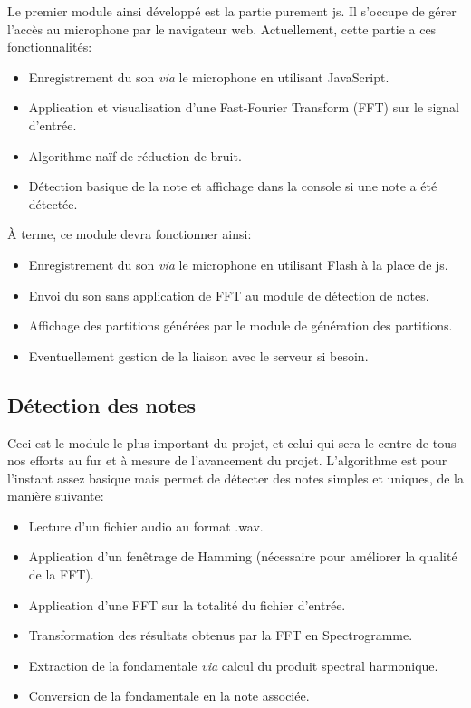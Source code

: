 \documentclass[12pt]{article}
\begin{document}
\par Le premier module ainsi développé est la partie purement js. Il s'occupe de gérer l'accès au microphone par le navigateur web. Actuellement, cette partie a ces fonctionnalités:
\begin{itemize}

\item Enregistrement du son \emph{via} le microphone en utilisant JavaScript.
\item Application et visualisation d'une Fast-Fourier Transform (FFT) sur le signal d'entrée.
\item Algorithme naïf de réduction de bruit.
\item Détection basique de la note et affichage dans la console si une note a été détectée.

\end{itemize}

\par \`A terme, ce module devra fonctionner ainsi:
\begin{itemize}

\item Enregistrement du son \emph{via} le microphone en utilisant Flash à la place de js.
\item Envoi du son sans application de FFT au module de détection de notes.
\item Affichage des partitions générées par le module de génération des partitions.
\item Eventuellement gestion de la liaison avec le serveur si besoin.

\end{itemize}
\subsection{Détection des notes}

\par Ceci est le module le plus important du projet, et celui qui sera le centre de tous nos efforts au fur et à mesure de l'avancement du projet. L'algorithme est pour l'instant assez basique mais permet de détecter des notes simples et uniques, de la manière suivante:

\begin{itemize}

\item Lecture d'un fichier audio au format .wav.
\item Application d'un fenêtrage de Hamming (nécessaire pour améliorer la qualité de la FFT).
\item Application d'une FFT sur la totalité du fichier d'entrée.
\item Transformation des résultats obtenus par la FFT en Spectrogramme.
\item Extraction de la fondamentale \emph{via} calcul du produit spectral harmonique.
\item Conversion de la fondamentale en la note associée.

\end{itemize}
\end{document}

